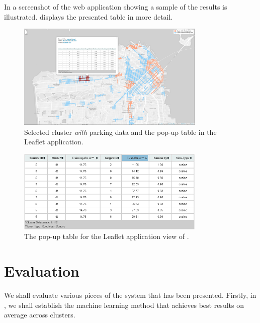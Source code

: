 In  a screenshot of the web application showing a sample of the results is illustrated.  displays the presented table in more detail.

\begin{figure}[!ht]
	\centering
	\includegraphics[width=0.8\textwidth]{graphics/cwith_source_dt_cosine.png}
	\caption{Selected cluster \textit{with} parking data and the pop-up table in the Leaflet application.}
	\label{fig:cwith}
\end{figure}

\begin{figure}[!ht]
	\centering
	\includegraphics[width=0.8\textwidth]{graphics/cwith_source_dt_cosine_table.png}
	\caption{The pop-up table for the Leaflet application view of .}
	\label{fig:cwith_table}
\end{figure}

\section{Evaluation}
We shall evaluate various pieces of the system that has been presented. Firstly, in , we shall establish the machine learning method that achieves best results on average across clusters. 

